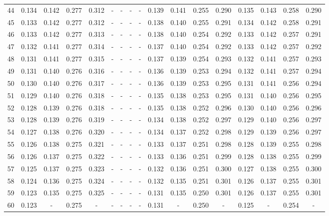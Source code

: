 \documentclass{report}
\begin{document}
\begin{appendices}
\begin{sidewaystable}
\begin{tabular}{|c|cccc|cccc|cccc|cccc|}
44 & 0.134 & 0.142 & 0.277 & 0.312 &   -   &   -   &   -   &   -   & 0.139 & 0.141 & 0.255 & 0.290 & 0.135 & 0.143 & 0.258 & 0.290\\
45 & 0.133 & 0.142 & 0.277 & 0.312 &   -   &   -   &   -   &   -   & 0.138 & 0.140 & 0.255 & 0.291 & 0.134 & 0.142 & 0.258 & 0.291\\
46 & 0.133 & 0.142 & 0.277 & 0.313 &   -   &   -   &   -   &   -   & 0.138 & 0.140 & 0.254 & 0.292 & 0.133 & 0.142 & 0.257 & 0.291\\
47 & 0.132 & 0.141 & 0.277 & 0.314 &   -   &   -   &   -   &   -   & 0.137 & 0.140 & 0.254 & 0.292 & 0.133 & 0.142 & 0.257 & 0.292\\
48 & 0.131 & 0.141 & 0.277 & 0.315 &   -   &   -   &   -   &   -   & 0.137 & 0.139 & 0.254 & 0.293 & 0.132 & 0.141 & 0.257 & 0.293\\
49 & 0.131 & 0.140 & 0.276 & 0.316 &   -   &   -   &   -   &   -   & 0.136 & 0.139 & 0.253 & 0.294 & 0.132 & 0.141 & 0.257 & 0.294\\
50 & 0.130 & 0.140 & 0.276 & 0.317 &   -   &   -   &   -   &   -   & 0.136 & 0.139 & 0.253 & 0.295 & 0.131 & 0.141 & 0.256 & 0.294\\
51 & 0.129 & 0.140 & 0.276 & 0.318 &   -   &   -   &   -   &   -   & 0.135 & 0.138 & 0.253 & 0.295 & 0.131 & 0.140 & 0.256 & 0.295\\
52 & 0.128 & 0.139 & 0.276 & 0.318 &   -   &   -   &   -   &   -   & 0.135 & 0.138 & 0.252 & 0.296 & 0.130 & 0.140 & 0.256 & 0.296\\
53 & 0.128 & 0.139 & 0.276 & 0.319 &   -   &   -   &   -   &   -   & 0.134 & 0.138 & 0.252 & 0.297 & 0.129 & 0.140 & 0.256 & 0.297\\
54 & 0.127 & 0.138 & 0.276 & 0.320 &   -   &   -   &   -   &   -   & 0.134 & 0.137 & 0.252 & 0.298 & 0.129 & 0.139 & 0.256 & 0.297\\
55 & 0.126 & 0.138 & 0.275 & 0.321 &   -   &   -   &   -   &   -   & 0.133 & 0.137 & 0.251 & 0.298 & 0.128 & 0.139 & 0.255 & 0.298\\
56 & 0.126 & 0.137 & 0.275 & 0.322 &   -   &   -   &   -   &   -   & 0.133 & 0.136 & 0.251 & 0.299 & 0.128 & 0.138 & 0.255 & 0.299\\
57 & 0.125 & 0.137 & 0.275 & 0.323 &   -   &   -   &   -   &   -   & 0.132 & 0.136 & 0.251 & 0.300 & 0.127 & 0.138 & 0.255 & 0.300\\
58 & 0.124 & 0.136 & 0.275 & 0.324 &   -   &   -   &   -   &   -   & 0.132 & 0.135 & 0.251 & 0.301 & 0.126 & 0.137 & 0.255 & 0.301\\
59 & 0.123 & 0.135 & 0.275 & 0.325 &   -   &   -   &   -   &   -   & 0.131 & 0.135 & 0.250 & 0.301 & 0.126 & 0.137 & 0.255 & 0.301\\
60 & 0.123 &   -   & 0.275 &   -   &   -   &   -   &   -   &   -   & 0.131 &   -   & 0.250 &   -   & 0.125 &   -   & 0.254 &   -  \\
\hline
\end{tabular}
\end{sidewaystable}


\end{appendices}
\end{document}
